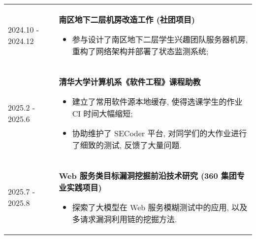 \documentclass[a4paper, 10pt]{article}
\begin{document}
\begin{tabular}{p{}p{}}
    2024.10 - 2024.12 & \textbf{南区地下二层机房改造工作 (社团项目)}
        \fontsize{8pt}{10pt}\selectfont \begin{itemize}[left=0pt,topsep=0pt,partopsep=0pt,parsep=0pt,itemsep=0pt]
            \item 参与设计了南区地下二层学生兴趣团队服务器机房, 重构了网络架构并部署了状态监测系统;
        \end{itemize} \\
    
    2025.2 - 2025.6 & \textbf{清华大学计算机系《软件工程》课程助教}
        \fontsize{8pt}{10pt}\selectfont \begin{itemize}[left=0pt,topsep=0pt,partopsep=0pt,parsep=0pt,itemsep=0pt]
            \item 建立了常用软件源本地缓存, 使得选课学生的作业 CI 时间大幅缩短;
            \item 协助维护了 SECoder 平台, 对同学们的大作业进行了细致的测试, 反馈了大量问题.
        \end{itemize} \\
    
    2025.7 - 2025.8 & \textbf{Web 服务类目标漏洞挖掘前沿技术研究 (360 集团专业实践项目)}
        \fontsize{8pt}{10pt}\selectfont \begin{itemize}[left=0pt,topsep=0pt,partopsep=0pt,parsep=0pt,itemsep=0pt]
            \item 探索了大模型在 Web 服务模糊测试中的应用, 以及多请求漏洞利用链的挖掘方法.
        \end{itemize}
\end{tabular}
\end{document}
